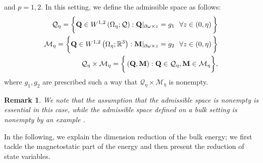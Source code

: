 \documentclass{article}
\newtheorem{remark}[theorem]{Remark}
\def\Qvec{\mathbf{Q}}
\def \Mvec{\mathbf{M}}
\begin{document}
and $p=1,2$.
In this setting, we define the admissible space as follows:
\begin{eqnarray}
\mathcal{Q}_{\eta}=\bigg\{\Qvec\in W^{1,2}\left(\Omega_{\eta}; \mathcal{Q}\right):\Qvec|_{\partial\omega\times z}= g_1~~\forall z\in\left(0, \eta\right)\bigg\}\nonumber\newline\\
\mathcal{M}_{\eta}=\bigg\{\Qvec\in W^{1,2}\left(\Omega_{\eta}; \mathbb R^3\right):\Mvec|_{\partial\omega\times z}= g_2~~\forall z\in\left(0, \eta\right)\bigg\}\nonumber\newline\\
\mathcal{Q}_{\eta}\times\mathcal{M}_{\eta}=\bigg\{\left(\Qvec, \Mvec\right): \Qvec\in\mathcal{Q}_{\eta}, \Mvec\in\mathcal{M}_{\eta}\bigg\},
\end{eqnarray}
where $g_1, g_2$ are prescribed such a way that $\mathcal{Q}_{\eta}\times\mathcal{M}_{\eta}$ is nonempty.
\begin{remark}
We note that the assumption that the admissible space is nonempty is essential in this case, while the admissible space defined on a bulk setting is nonempty by an example \cite{bethuel1994ginzburg}.
\end{remark}
In the following, we explain the dimension reduction of the bulk energy; we first tackle the magnetostatic part of the energy and then present the reduction of state variables. 
\end{document}

